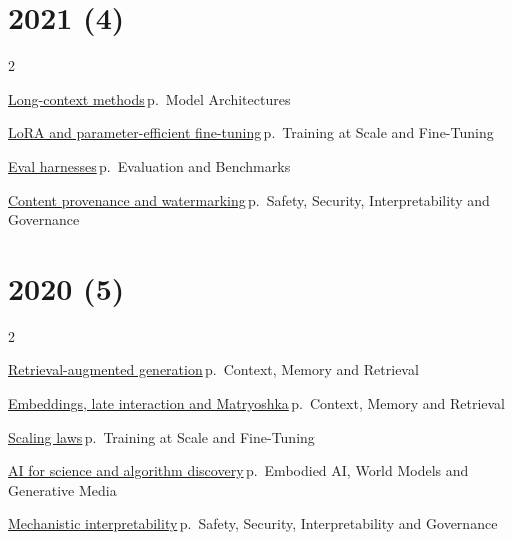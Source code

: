 \documentclass[10pt,a4paper,openany]{report}
\begin{document}
\section{2021 (4)}
\begin{multicols}{2}\small\raggedright
\hyperref[c:arch-7]{Long-context methods}\,{\color{muted}\scriptsize p.\,\pageref{c:arch-7}} {\color{muted}\scriptsize Model Architectures}\par\vspace{2pt}
\hyperref[c:training-5]{LoRA and parameter-efficient fine-tuning}\,{\color{muted}\scriptsize p.\,\pageref{c:training-5}} {\color{muted}\scriptsize Training at Scale and Fine-Tuning}\par\vspace{2pt}
\hyperref[c:evals-0]{Eval harnesses}\,{\color{muted}\scriptsize p.\,\pageref{c:evals-0}} {\color{muted}\scriptsize Evaluation and Benchmarks}\par\vspace{2pt}
\hyperref[c:safety-14]{Content provenance and watermarking}\,{\color{muted}\scriptsize p.\,\pageref{c:safety-14}} {\color{muted}\scriptsize Safety, Security, Interpretability and Governance}\par\vspace{2pt}
\end{multicols}
\section{2020 (5)}
\begin{multicols}{2}\small\raggedright
\hyperref[c:context-5]{Retrieval-augmented generation}\,{\color{muted}\scriptsize p.\,\pageref{c:context-5}} {\color{muted}\scriptsize Context, Memory and Retrieval}\par\vspace{2pt}
\hyperref[c:context-8]{Embeddings, late interaction and Matryoshka}\,{\color{muted}\scriptsize p.\,\pageref{c:context-8}} {\color{muted}\scriptsize Context, Memory and Retrieval}\par\vspace{2pt}
\hyperref[c:training-1]{Scaling laws}\,{\color{muted}\scriptsize p.\,\pageref{c:training-1}} {\color{muted}\scriptsize Training at Scale and Fine-Tuning}\par\vspace{2pt}
\hyperref[c:embodied-7]{AI for science and algorithm discovery}\,{\color{muted}\scriptsize p.\,\pageref{c:embodied-7}} {\color{muted}\scriptsize Embodied AI, World Models and Generative Media}\par\vspace{2pt}
\hyperref[c:safety-6]{Mechanistic interpretability}\,{\color{muted}\scriptsize p.\,\pageref{c:safety-6}} {\color{muted}\scriptsize Safety, Security, Interpretability and Governance}\par\vspace{2pt}
\end{multicols}
\end{document}
